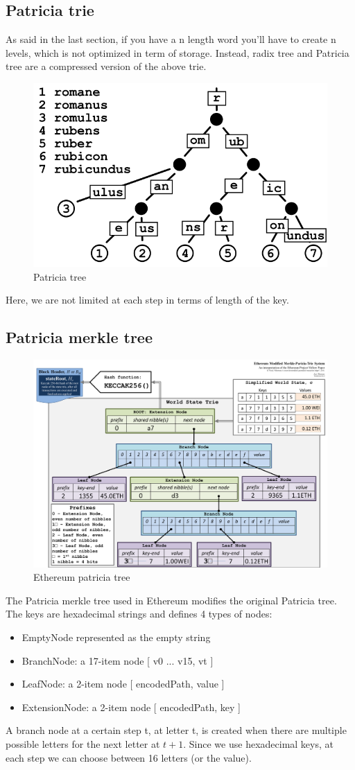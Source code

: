 \subsection{Patricia trie}
As said in the last section, if you have a n length word you'll have to create n levels, which is not optimized in term of storage. 
Instead, radix tree and Patricia tree are a compressed version of the above trie.
\begin{figure}[H]
    \centering
\includegraphics[width=0.4\linewidth]{background/patricia.png}
    \caption{Patricia tree}
    \label{fig:patricia}
\end{figure}
Here, we are not limited at each step in terms of length of the key.

\subsection{Patricia merkle tree}
\label{merkle:ethereum}
\begin{figure}[H]
    \centering
\includegraphics[width=0.9\linewidth]{background/ethereum_mpt.png}
    \caption{Ethereum patricia tree}
    \label{fig:eth_mpt}
\end{figure}

The Patricia merkle tree used in Ethereum modifies the original Patricia tree. The keys are hexadecimal strings and defines 4 types of nodes: 
\begin{itemize}
    \item EmptyNode represented as the empty string
    \item BranchNode: a 17-item node [ v0 ... v15, vt ]
    \item LeafNode: a 2-item node [ encodedPath, value ]
    \item ExtensionNode: a 2-item node [ encodedPath, key ]
\end{itemize}
A branch node at a certain step t, at letter t, is created when there are multiple possible letters for the next letter at $t+1$. Since we use hexadecimal keys, at each step we can choose between 16 letters (or the value).

